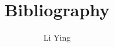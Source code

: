 \documentclass[a4paper,10pt]{article}
\author{Li Ying}
\title{Bibliography}
\begin{document}
\maketitle
\nocite{*}

\end{document}
